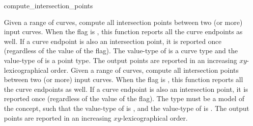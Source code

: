 \ccRefPageBegin

\begin{ccRefFunction}{compute_intersection_points}


{Given a range of curves, compute all intersection points between two (or more)
 input curves. When the flag  is , 
  this function reports all the curve endpoints as well. If a curve
  endpoint is also an intersection point, it is reported once (regardless
  of the value of the  flag). The value-type of
   is a curve type and the value-type of 
  is a point type. The output points are reported in an increasing
  $xy$-lexicographical order.}
\ccGlue
{}
{Given a range of curves, compute all intersection points between two (or more)
 input curves. When the flag  is , 
  this function reports all the curve endpoints as well. If a curve
  endpoint is also an intersection point, it is reported once (regardless
  of the value of the  flag). The  type
  must be a model of the  concept, such that the
  value-type of  is , and the
  value-type of  is .
 The output points are reported in an increasing $xy$-lexicographical order.}
\end{ccRefFunction}

\ccRefPageEnd

